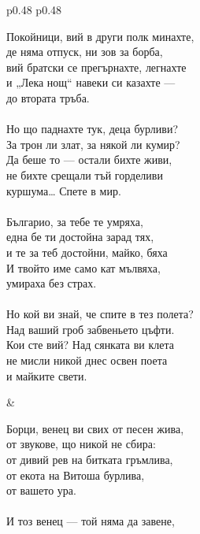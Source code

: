 \documentclass[12pt,a4paper]{article}
\begin{document}
\begin{tabular}{p{0.48\textwidth} p{0.48\textwidth}}
\begin{minipage}[t]{\linewidth}
Покойници, вий в други полк минахте,\\
де няма отпуск, ни зов за борба,\\
вий братски се прегърнахте, легнахте\\
и „Лека нощ“ навеки си казахте —\\
\hspace*{1.5cm} до втората тръба.\\
\\
Но що паднахте тук, деца бурливи?\\
За трон ли злат, за някой ли кумир?\\
Да беше то — остали бихте живи,\\
не бихте срещали тъй горделиви\\
\hspace*{1.5cm} куршума… Спете в мир.\\
\\
Българио, за тебе те умряха,\\
една бе ти достойна зарад тях,\\
и те за теб достойни, майко, бяха\\
И твойто име само кат мълвяха,\\
\hspace*{1.5cm} умираха без страх.\\
\\
Но кой ви знай, че спите в тез полета?\\
Над ваший гроб забвеньето цъфти.\\
Кои сте вий? Над сянката ви клета\\
не мисли никой днес освен поета\\
\hspace*{1.5cm} и майките свети.\\
\end{minipage}
&
\begin{minipage}[t]{\linewidth}
Борци, венец ви свих от песен жива,\\
от звукове, що никой не сбира:\\
от дивий рев на битката гръмлива,\\
от екота на Витоша бурлива,\\
\hspace*{1.5cm} от вашето ура.\\
\\
И тоз венец — той няма да завене,\\

\end{minipage}
\end{tabular}
\end{document}
